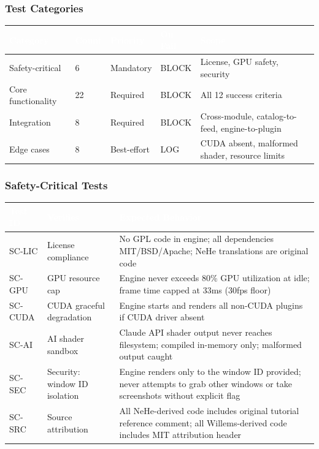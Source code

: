 \documentclass[11pt,letterpaper]{article}
\newcommand{\tableheader}[1]{\textbf{\sffamily\textcolor{white}{#1}}}
\begin{document}
\subsubsection{Test Categories}

\begin{center}
\begin{tabularx}{\textwidth}{L{3cm}C{1.5cm}C{2cm}C{2cm}X}
\toprule
{}
\tableheader{Category} & \tableheader{Count} & \tableheader{Priority} & \tableheader{On Fail} & \tableheader{Scope} \\
\midrule
Safety-critical & 6 & Mandatory & BLOCK & License, GPU safety, security \\
Core functionality & 22 & Required & BLOCK & All 12 success criteria \\
Integration & 8 & Required & BLOCK & Cross-module, catalog-to-feed, engine-to-plugin \\
Edge cases & 8 & Best-effort & LOG & CUDA absent, malformed shader, resource limits \\
\bottomrule
\end{tabularx}
\end{center}

\subsubsection{Safety-Critical Tests}

\begin{center}
\begin{tabularx}{\textwidth}{C{1.5cm}L{3.5cm}X}
\toprule
{}
\tableheader{Test ID} & \tableheader{Verifies} & \tableheader{Expected Behavior} \\
\midrule
SC-LIC & License compliance & No GPL code in engine; all dependencies MIT/BSD/Apache; NeHe translations are original code \\
SC-GPU & GPU resource cap & Engine never exceeds 80\% GPU utilization at idle; frame time capped at 33ms (30fps floor) \\
SC-CUDA & CUDA graceful degradation & Engine starts and renders all non-CUDA plugins if CUDA driver absent \\
SC-AI & AI shader sandbox & Claude API shader output never reaches filesystem; compiled in-memory only; malformed output caught \\
SC-SEC & Security: window ID isolation & Engine renders only to the window ID provided; never attempts to grab other windows or take screenshots without explicit flag \\
SC-SRC & Source attribution & All NeHe-derived code includes original tutorial reference comment; all Willems-derived code includes MIT attribution header \\
\bottomrule
\end{tabularx}
\end{center}
\end{document}
